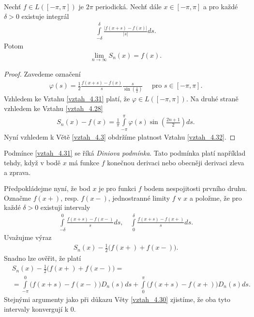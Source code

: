 \begin{theorem}[Dini]\label{vztah_4.30}
Nechť $f \in L([-\pi, \pi])$ je $2\pi$ periodická. Nechť dále $x \in [-\pi, \pi]$ a pro každé $\delta > 0$ existuje integrál
\begin{align}\label{vztah_4.31}
\int \limits_{-\delta}^\delta \frac{|f(x + s) - f(x)|}{|s|} ds.
\end{align}
Potom
\begin{align}\label{vztah_4.32}
\lim_{n \rightarrow \infty} S_n (x) = f(x).
\end{align}
\end{theorem}
\begin{proof}
Zavedeme označení
\begin{align*}
\varphi (s) = \frac{1}{2} \frac{f(x + s) - f(x)}{s} \frac{s}{\sin \left( \frac{s}{2} \right) } \quad \textrm{ pro } s \in [-\pi, \pi].
\end{align*}
Vzhledem ke Vztahu \eqref{vztah_4.31} platí, že $\varphi \in L([-\pi, \pi])$. Na druhé straně vzhledem ke Vztahu \eqref{vztah_4.28}
\begin{align*}
S_n (x) - f(x) = \frac{1}{\pi} \int \limits_{-\pi}^\pi \varphi (s) \sin \left( \frac{2n + 1}{2} \right) ds.
\end{align*}
Nyní vzhledem k Větě \eqref{vztah_4.3} obdržíme platnost Vztahu \eqref{vztah_4.32}.
\end{proof}


\begin{poznamka}\label{p_4.31}
Podmínce \eqref{vztah_4.31} se říká \textit{Diniova podmínka}. Tato podmínka platí například tehdy, když v bodě $x$ má funkce $f$ konečnou derivaci nebo obecněji derivaci zleva a zprava.
\end{poznamka}

Předpokládejme nyní, že bod $x$ je pro funkci $f$ bodem nespojitosti prvního druhu. Označme $f(x+)$, resp. $f(x-)$, jednostranné limity $f$ v $x$ a položme, že pro každé $\delta > 0$ existují intervaly
\begin{align}\label{vztah_4.33}
\int \limits_{-\delta}^0 \frac{f(x + s) - f(x-)}{s} ds, \quad \int \limits_0^\delta \frac{f(x + s) - f(x+)}{s} ds.
\end{align}
Uvažujme výraz
\begin{align*}
S_n (x) - \frac{1}{2} \Big(f (x+) + f (x-)\Big).
\end{align*}
Snadno lze ověřit, že platí
\begin{align*}
&S_n (x) - \frac{1}{2} \Big( f (x+) + f (x-) \Big) =\\ &=\int \limits_{-\pi}^0 \Big(f (x + s) - f (x-)\Big) D_n (s) ds + \int \limits_0^\pi \Big(f (x + s) - f (x+)\Big) D_n (s) ds.
\end{align*}
Stejnými argumenty jako při důkazu Věty \eqref{vztah_4.30} zjistíme, že oba tyto intervaly  konvergují k $0$.


